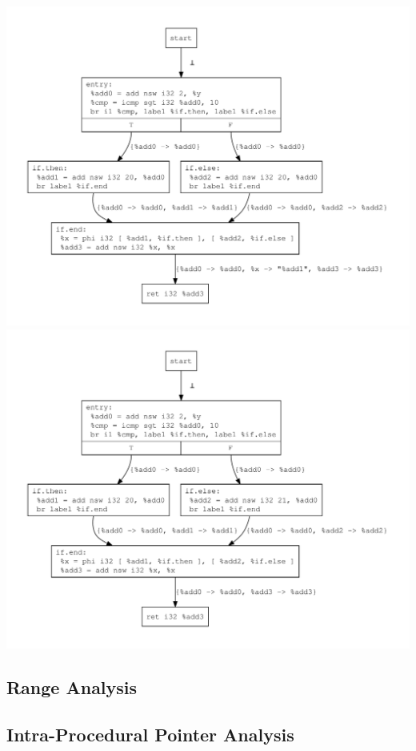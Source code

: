 \documentclass{article}
\theoremstyle{definition}
\begin{document}
\includegraphics[scale=.4]{figures/cse/branch/can-do-cse.pdf}
\includegraphics[scale=.4]{figures/cse/branch/no-do.pdf}

\subsection{Range Analysis}
\subsection{Intra-Procedural Pointer Analysis}
\end{document}
